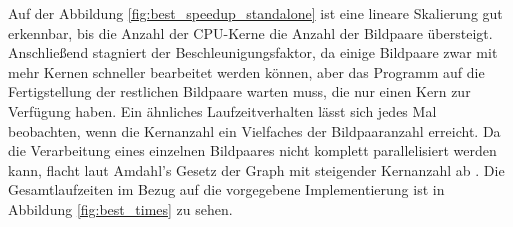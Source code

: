 Auf der Abbildung \ref{fig:best_speedup_standalone} ist eine lineare Skalierung gut erkennbar, bis die Anzahl der \gls{CPU}-Kerne die Anzahl der Bildpaare übersteigt. Anschließend stagniert der Beschleunigungsfaktor, da einige Bildpaare zwar mit mehr Kernen schneller bearbeitet werden können, aber das Programm auf die Fertigstellung der restlichen Bildpaare warten muss, die nur einen Kern zur Verfügung haben. Ein ähnliches Laufzeitverhalten lässt sich jedes Mal beobachten, wenn die Kernanzahl ein Vielfaches der Bildpaaranzahl erreicht. Da die Verarbeitung eines einzelnen Bildpaares nicht komplett parallelisiert werden kann, flacht laut Amdahl's Gesetz der Graph mit steigender Kernanzahl ab \cite{Amd67}. Die Gesamtlaufzeiten im Bezug auf die vorgegebene Implementierung ist in Abbildung \ref{fig:best_times} zu sehen. 

